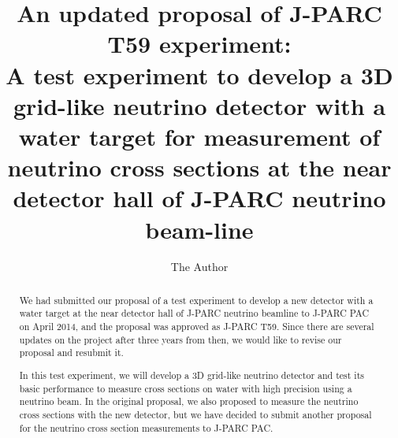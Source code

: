 \documentclass[11pt, oneside]{article}   	%
\title{An updated proposal of J-PARC T59 experiment:\\
A test experiment to develop a 3D grid-like neutrino detector
with a water target for measurement of neutrino cross sections
at the near detector hall of J-PARC neutrino beam-line}
\author{The Author}
\begin{document}
\linenumbers
\maketitle

\begin{abstract}
We had submitted our proposal of a test experiment to develop a new detector with a water target
at the near detector hall of J-PARC neutrino beamline to J-PARC PAC on April 2014, 
and the proposal was approved as J-PARC T59.
Since there are several updates on the project after three years from then, 
we would like to revise our proposal and resubmit it.


In this test experiment, we will develop a 3D grid-like neutrino detector and 
test its basic performance to measure cross sections on water with high precision 
using a neutrino beam.
In the original proposal, we also proposed to measure the neutrino cross sections with the new detector,
but we have decided to submit another proposal for the neutrino cross section measurements to J-PARC PAC.
\end{abstract}








\end{document}
